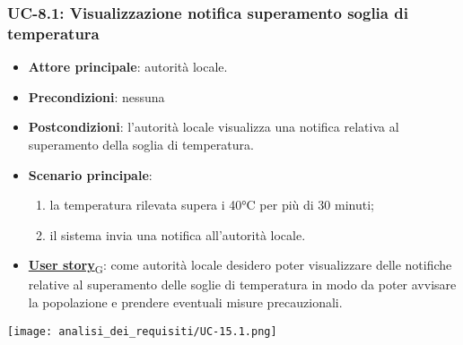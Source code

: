 \subsubsection{UC-8.1: Visualizzazione notifica superamento soglia di temperatura}
\begin{itemize}
	\item \textbf{Attore principale}: autorità locale.
	\item \textbf{Precondizioni}: nessuna
	\item \textbf{Postcondizioni}: l'autorità locale visualizza una notifica relativa al superamento della soglia di temperatura.
	\item \textbf{Scenario principale}:
	      \begin{enumerate}
		      \item la temperatura rilevata supera i 40°C per più di 30 minuti;
		      \item il sistema invia una notifica all'autorità locale.
	      \end{enumerate}
	\item \href{https://7last.github.io/docs/pb/documentazione-interna/glossario\#user-story}{\textbf{User story}\textsubscript{G}}:
	      come autorità locale desidero poter visualizzare delle notifiche relative al superamento delle soglie di temperatura
	      in modo da poter avvisare la popolazione e prendere eventuali misure precauzionali.
\end{itemize}
\begin{center}
	\texttt{[image: analisi\_dei\_requisiti/UC-15.1.png]}
\end{center}


